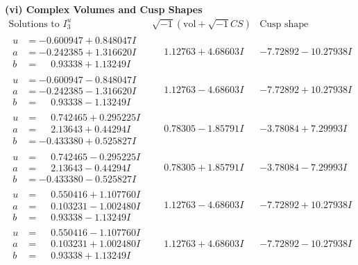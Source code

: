 \documentclass[1p]{elsarticle_modified}
\theoremstyle{definition}
\newcommand{\I}{\sqrt{-1}}
\begin{document}
\newpage\flushleft \textbf{(vi) Complex Volumes and Cusp Shapes}
$$\begin{array}{c|c|c}  
\text{Solutions to }I^u_{3}& \I (\text{vol} + \sqrt{-1}CS) & \text{Cusp shape}\\
 \hline 
\begin{aligned}
u &= -0.600947 + 0.848047 I \\
a &= -0.242385 + 1.316620 I \\
b &= \phantom{-}0.93338 + 1.13249 I\end{aligned}
 & \phantom{-}1.12763 + 4.68603 I & -7.72892 - 10.27938 I \\ \hline\begin{aligned}
u &= -0.600947 - 0.848047 I \\
a &= -0.242385 - 1.316620 I \\
b &= \phantom{-}0.93338 - 1.13249 I\end{aligned}
 & \phantom{-}1.12763 - 4.68603 I & -7.72892 + 10.27938 I \\ \hline\begin{aligned}
u &= \phantom{-}0.742465 + 0.295225 I \\
a &= \phantom{-}2.13643 + 0.44294 I \\
b &= -0.433380 + 0.525827 I\end{aligned}
 & \phantom{-}0.78305 - 1.85791 I & -3.78084 + 7.29993 I \\ \hline\begin{aligned}
u &= \phantom{-}0.742465 - 0.295225 I \\
a &= \phantom{-}2.13643 - 0.44294 I \\
b &= -0.433380 - 0.525827 I\end{aligned}
 & \phantom{-}0.78305 + 1.85791 I & -3.78084 - 7.29993 I \\ \hline\begin{aligned}
u &= \phantom{-}0.550416 + 1.107760 I \\
a &= \phantom{-}0.103231 - 1.002480 I \\
b &= \phantom{-}0.93338 - 1.13249 I\end{aligned}
 & \phantom{-}1.12763 - 4.68603 I & -7.72892 + 10.27938 I \\ \hline\begin{aligned}
u &= \phantom{-}0.550416 - 1.107760 I \\
a &= \phantom{-}0.103231 + 1.002480 I \\
b &= \phantom{-}0.93338 + 1.13249 I\end{aligned}
 & \phantom{-}1.12763 + 4.68603 I & -7.72892 - 10.27938 I \\ \hline\begin{aligned}

\end{aligned}
\end{array}$$
\end{document}
